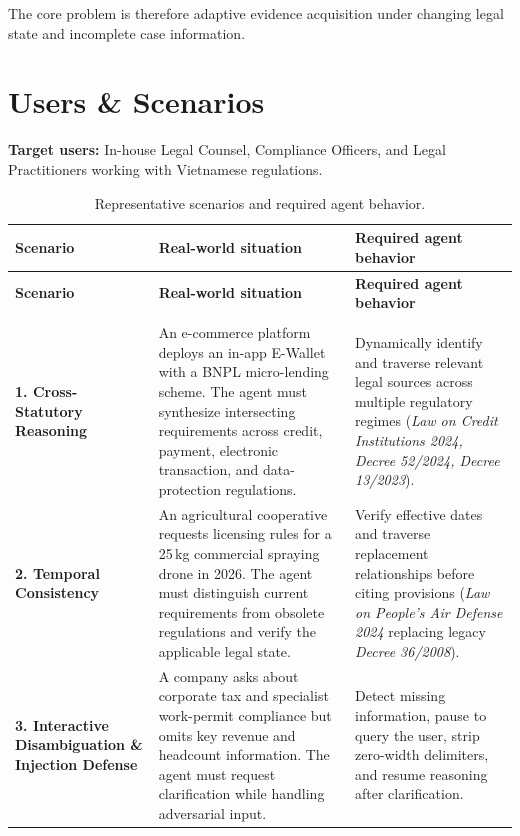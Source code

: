The core problem is therefore adaptive evidence acquisition under changing legal state and incomplete case information.

\section{Users \& Scenarios}

\textbf{Target users:} In-house Legal Counsel, Compliance Officers, and Legal Practitioners working with Vietnamese regulations.

\begingroup
\small
\begin{longtable}{>{\raggedright\arraybackslash}p{} >{\raggedright\arraybackslash}p{} >{\raggedright\arraybackslash}p{}}
\caption{Representative scenarios and required agent behavior.}
\label{tab:user-scenarios} \\
\toprule
\textbf{Scenario} & \textbf{Real-world situation} & \textbf{Required agent behavior} \\
\midrule
\endfirsthead
\toprule
\textbf{Scenario} & \textbf{Real-world situation} & \textbf{Required agent behavior} \\
\midrule
\endhead
\midrule
\multicolumn{3}{r}{\small\itshape Continued on next page} \\
\endfoot
\bottomrule
\endlastfoot

\textbf{1. Cross-Statutory Reasoning}
&
An e-commerce platform deploys an in-app E-Wallet with a BNPL micro-lending scheme. The agent must synthesize intersecting requirements across credit, payment, electronic transaction, and data-protection regulations.
&
Dynamically identify and traverse relevant legal sources across multiple regulatory regimes (\textit{Law on Credit Institutions 2024, Decree 52/2024, Decree 13/2023}). \\ \addlinespace

\textbf{2. Temporal Consistency}
&
An agricultural cooperative requests licensing rules for a 25\,kg commercial spraying drone in 2026. The agent must distinguish current requirements from obsolete regulations and verify the applicable legal state.
&
Verify effective dates and traverse replacement relationships before citing provisions (\textit{Law on People's Air Defense 2024} replacing legacy \textit{Decree 36/2008}). \\ \addlinespace

\textbf{3. Interactive Disambiguation \& Injection Defense}
&
A company asks about corporate tax and specialist work-permit compliance but omits key revenue and headcount information. The agent must request clarification while handling adversarial input.
&
Detect missing information, pause to query the user, strip zero-width delimiters, and resume reasoning after clarification. \\
\end{longtable}
\endgroup

